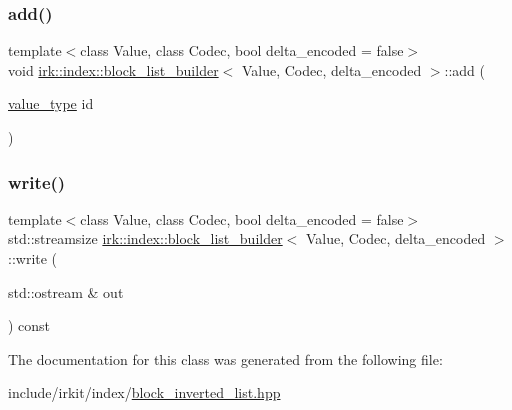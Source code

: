 \subsubsection{\texorpdfstring{add()}{add()}}
{\footnotesize\ttfamily template$<$class Value, class Codec, bool delta\+\_\+encoded = false$>$ \\
void \mbox{\hyperlink{classirk_1_1index_1_1block__list__builder}{irk\+::index\+::block\+\_\+list\+\_\+builder}}$<$ Value, Codec, delta\+\_\+encoded $>$\+::add (\begin{DoxyParamCaption}\item[{\mbox{\hyperlink{classirk_1_1index_1_1block__list__builder_aee4746d79079e00283a5f7a3ad071b5e}{value\+\_\+type}}}]{id }\end{DoxyParamCaption})\hspace{0.3cm}{\ttfamily [inline]}}

\mbox{\label{classirk_1_1index_1_1block__list__builder_a003cb5e11a447ddf8ae03da4ba47a036}} 
\subsubsection{\texorpdfstring{write()}{write()}}
{\footnotesize\ttfamily template$<$class Value, class Codec, bool delta\+\_\+encoded = false$>$ \\
std\+::streamsize \mbox{\hyperlink{classirk_1_1index_1_1block__list__builder}{irk\+::index\+::block\+\_\+list\+\_\+builder}}$<$ Value, Codec, delta\+\_\+encoded $>$\+::write (\begin{DoxyParamCaption}\item[{std\+::ostream \&}]{out }\end{DoxyParamCaption}) const\hspace{0.3cm}{\ttfamily [inline]}}



The documentation for this class was generated from the following file\+:\begin{DoxyCompactItemize}
\item 
include/irkit/index/\mbox{\hyperlink{block__inverted__list_8hpp}{block\+\_\+inverted\+\_\+list.\+hpp}}\end{DoxyCompactItemize}
